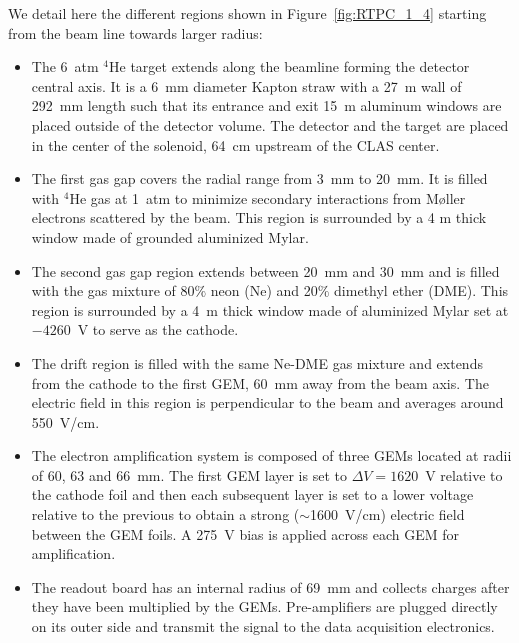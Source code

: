 \documentclass[preprint,5p]{elsarticle}
\begin{document}
We detail here the different regions shown in Figure~\ref{fig:RTPC_1_4} 
starting from the beam line towards larger radius:\\
\begin{itemize}
  \item The 6~atm $^4$He target extends along the beamline forming the detector 
     central axis. It is a 6~mm diameter Kapton straw with a 27~\textmu{}m wall 
     of 292~mm length such that its entrance and exit 15~\textmu{}m aluminum windows 
     are placed outside of the detector volume. The detector and the target are 
     placed in the center of the solenoid, 64~cm upstream of the CLAS center.
   \item The first gas gap covers the radial range from 3~mm to 20~mm. It is 
      filled with $^{4}$He gas at 1~atm to minimize secondary interactions from
      M\o{}ller electrons scattered by the beam. This region is surrounded by 
      a 4 \textmu{}m thick window made of grounded aluminized Mylar.
   \item The second gas gap region extends between 20~mm and 30~mm and is 
      filled with the gas mixture of 80$\%$ neon (Ne) and 20$\%$ dimethyl ether 
      (DME).  This region is surrounded by a 4~\textmu{}m thick window made of 
      aluminized Mylar set at $-4260$~V to serve as the cathode.
   \item The drift region is filled with the same Ne-DME gas mixture and 
      extends from the cathode to the first GEM, 60~mm away from the beam axis.  
      The electric field in this region is perpendicular to the beam and 
      averages around 550~V/cm.
   \item The electron amplification system is composed of three GEMs located at 
      radii of 60, 63 and 66~mm. The first GEM layer is 
      set to $\Delta V=1620$~V relative to the cathode foil and then each subsequent 
      layer is set to a lower voltage relative to the previous to obtain a 
      strong ($\sim$1600~V/cm) electric field between the GEM foils. A 275~V bias is 
      applied across each GEM for amplification.
   \item The readout board has an internal radius of 69~mm and collects charges 
      after they have been multiplied by the GEMs. Pre-amplifiers are plugged 
      directly on its outer side and transmit the signal to the data 
      acquisition electronics.
\end{itemize}
\end{document}
